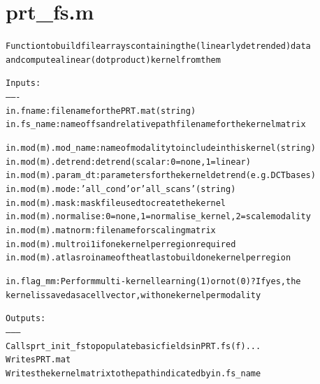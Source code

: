 \section{prt\_fs.m}
\begin{alltt}

 Function to build file arrays containing the (linearly detrended) data
 and compute a linear (dot product) kernel from them
 
 Inputs:
 -------
 in.fname:      filename for the PRT.mat (string)
 in.fs\_name:    name of fs and relative path filename for the kernel matrix
 
 in.mod(m).mod\_name:  name of modality to include in this kernel (string)
 in.mod(m).detrend:   detrend (scalar: 0 = none, 1 = linear)
 in.mod(m).param\_dt:  parameters for the kernel detrend (e.g. DCT bases)
 in.mod(m).mode:      'all\_cond' or 'all\_scans' (string)
 in.mod(m).mask:      mask file used to create the kernel
 in.mod(m).normalise: 0 = none, 1 = normalise\_kernel, 2 = scale modality
 in.mod(m).matnorm:   filename for scaling matrix
 in.mod(m).multroi    1 if one kernel per region required
 in.mod(m).atlasroi   name of the atlas to build one kernel per region
 
 in.flag\_mm:   Perform multi-kernel learning (1) or not (0)? If yes, the
 kernel is saved as a cell vector, with one kernel per modality
 
 Outputs:
 --------
 Calls prt\_init\_fs to populate basic fields in PRT.fs(f)...
 Writes PRT.mat
 Writes the kernel matrix to the path indicated by in.fs\_name
\end{alltt}


